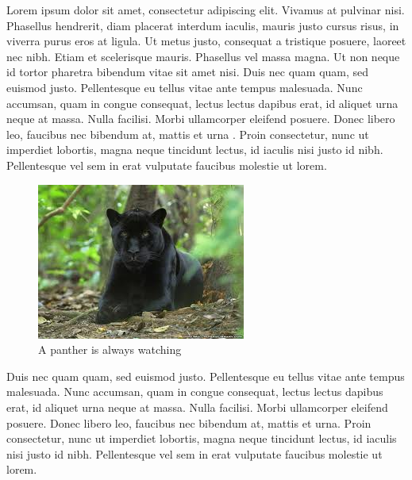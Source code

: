 


Lorem ipsum dolor sit amet, consectetur adipiscing elit. Vivamus at pulvinar nisi. Phasellus hendrerit, diam placerat interdum iaculis, mauris justo cursus risus, in viverra purus eros at ligula. Ut metus justo, consequat a tristique posuere, laoreet nec nibh. Etiam et scelerisque mauris. Phasellus vel massa magna. Ut non neque id tortor pharetra bibendum vitae sit amet nisi. Duis nec quam quam, sed euismod justo. Pellentesque eu tellus vitae ante tempus malesuada. Nunc accumsan, quam in congue consequat, lectus lectus dapibus erat, id aliquet urna neque at massa. Nulla facilisi. Morbi ullamcorper eleifend posuere. Donec libero leo, faucibus nec bibendum at, mattis et urna \cite{AWriter}. Proin consectetur, nunc ut imperdiet lobortis, magna neque tincidunt lectus, id iaculis nisi justo id nibh. Pellentesque vel sem in erat vulputate faucibus molestie ut lorem.

\begin{figure}
    \centering
    \includegraphics[scale=1, angle=0]{Files/panther.jpg}
    \caption[The panther]{A panther is always watching}
    \label{fig: jordan}
\end{figure}

Duis nec quam quam, sed euismod justo. Pellentesque eu tellus vitae ante tempus malesuada. Nunc accumsan, quam in congue consequat, lectus lectus dapibus erat, id aliquet urna neque at massa. Nulla facilisi. Morbi ullamcorper eleifend posuere. Donec libero leo, faucibus nec bibendum at, mattis et urna. Proin consectetur, nunc ut imperdiet lobortis, magna neque tincidunt lectus, id iaculis nisi justo id nibh. Pellentesque vel sem in erat vulputate faucibus molestie ut lorem.


